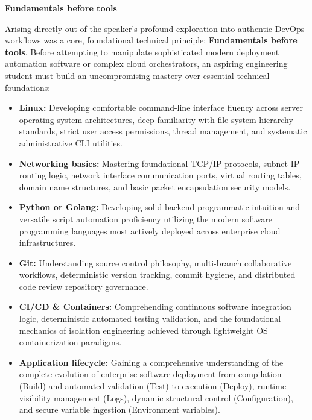 \vspace{0.5em}\noindent\textbf{Fundamentals before tools}\par

Arising directly out of the speaker's profound exploration into
authentic DevOps workflows was a core, foundational technical principle:
\textbf{Fundamentals before tools}. Before attempting to manipulate
sophisticated modern deployment automation software or complex cloud
orchestrators, an aspiring engineering student must build an
uncompromising mastery over essential technical foundations:

\begin{itemize}
\tightlist
\item
  \textbf{Linux:} Developing comfortable command-line interface fluency
  across server operating system architectures, deep familiarity with
  file system hierarchy standards, strict user access permissions,
  thread management, and systematic administrative CLI utilities.
\item
  \textbf{Networking basics:} Mastering foundational TCP/IP protocols,
  subnet IP routing logic, network interface communication ports,
  virtual routing tables, domain name structures, and basic packet
  encapsulation security models.
\item
  \textbf{Python or Golang:} Developing solid backend programmatic
  intuition and versatile script automation proficiency utilizing the
  modern software programming languages most actively deployed across
  enterprise cloud infrastructures.
\item
  \textbf{Git:} Understanding source control philosophy, multi-branch
  collaborative workflows, deterministic version tracking, commit
  hygiene, and distributed code review repository governance.
\item
  \textbf{CI/CD \& Containers:} Comprehending continuous software
  integration logic, deterministic automated testing validation, and the
  foundational mechanics of isolation engineering achieved through
  lightweight OS containerization paradigms.
\item
  \textbf{Application lifecycle:} Gaining a comprehensive understanding
  of the complete evolution of enterprise software deployment from
  compilation (Build) and automated validation (Test) to execution
  (Deploy), runtime visibility management (Logs), dynamic structural
  control (Configuration), and secure variable ingestion (Environment
  variables).
\end{itemize}

